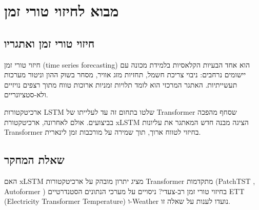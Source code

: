 
\chapter{מבוא לחיזוי טורי זמן}

\section{חיזוי טורי זמן ואתגריו}

חיזוי טורי זמן (\textenglish{time series forecasting}) הוא אחד הבעיות הקלאסיות בלמידת מכונה עם יישומים נרחבים: ניבוי צריכת חשמל, תחזיות מזג אוויר, מסחר בשוק ההון וניטור מערכות תעשייתיות. האתגר המרכזי הוא לומד תלויות זמניות ארוכות טווח מתוך רצפים נויזיים ולא-סטציונריים.

ארכיטקטורות \textenglish{LSTM} \cite{hochreiter1997lstm} שלטו בתחום זה עד לעלייתו של \textenglish{Transformer} \cite{vaswani2017attention} שסחף מהפכה בביצועים. אולם לאחרונה, ארכיטקטורת \textenglish{xLSTM} \cite{beck2024xlstm} הציגה מבנה חדש המאתגר את עליונות \textenglish{Transformer} בחיזוי לטווח ארוך, תוך שמירה על מורכבות זמן לינארית.

\section{שאלת המחקר}

האם \textenglish{xLSTM} מציג יתרון מובהק על ארכיטקטורות \textenglish{Transformer} מתקדמות (\textenglish{PatchTST} \cite{nie2022patchtst}, \textenglish{Autoformer} \cite{wu2021autoformer}) בחיזוי טורי זמן רב-צעדי? ניסויים על מערכי הנתונים הסטנדרטיים \textenglish{ETT} (\textenglish{Electricity Transformer Temperature}) ו-\textenglish{Weather} נועדו לענות על שאלה זו.
